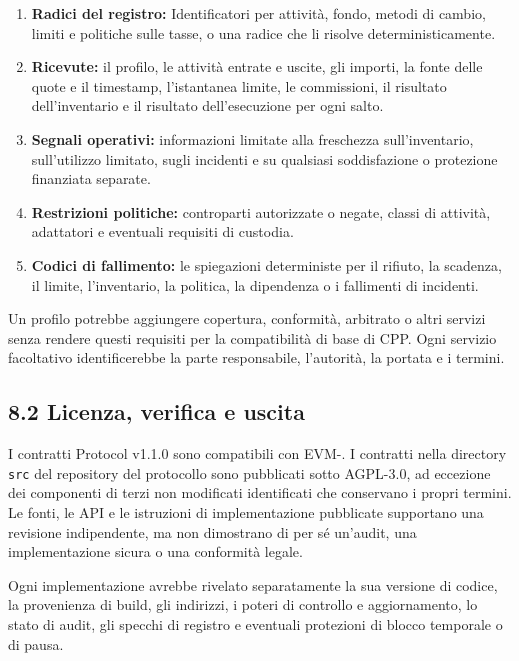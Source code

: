 \documentclass[11pt]{article}
\begin{document}
\begin{enumerate}[leftmargin=*]
\item \textbf{Radici del registro:} Identificatori per attività, fondo, metodi di cambio, limiti e politiche sulle tasse, o una radice che li risolve deterministicamente.
\item \textbf{Ricevute:} il profilo, le attività entrate e uscite, gli importi, la fonte delle quote e il timestamp, l'istantanea limite, le commissioni, il risultato dell'inventario e il risultato dell'esecuzione per ogni salto.
\item \textbf{Segnali operativi:} informazioni limitate alla freschezza sull'inventario, sull'utilizzo limitato, sugli incidenti e su qualsiasi soddisfazione o protezione finanziata separate.
\item \textbf{Restrizioni politiche:} controparti autorizzate o negate, classi di attività, adattatori e eventuali requisiti di custodia.
\item \textbf{Codici di fallimento:} le spiegazioni deterministe per il rifiuto, la scadenza, il limite, l'inventario, la politica, la dipendenza o i fallimenti di incidenti.
\end{enumerate}
Un profilo potrebbe aggiungere copertura, conformità, arbitrato o altri servizi senza rendere questi requisiti per la compatibilità di base di CPP. Ogni servizio facoltativo identificerebbe la parte responsabile, l'autorità, la portata e i termini.

\subsection*{8.2 Licenza, verifica e uscita}

I contratti Protocol v1.1.0 sono compatibili con EVM-. I contratti nella directory \texttt{src} del repository del protocollo sono pubblicati sotto AGPL-3.0, ad eccezione dei componenti di terzi non modificati identificati che conservano i propri termini. Le fonti, le API e le istruzioni di implementazione pubblicate supportano una revisione indipendente, ma non dimostrano di per sé un'audit, una implementazione sicura o una conformità legale.

Ogni implementazione avrebbe rivelato separatamente la sua versione di codice, la provenienza di build, gli indirizzi, i poteri di controllo e aggiornamento, lo stato di audit, gli specchi di registro e eventuali protezioni di blocco temporale o di pausa.
\end{document}
